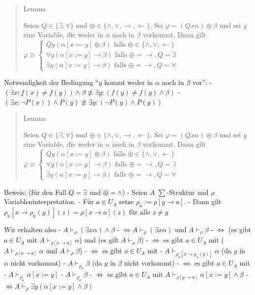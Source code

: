 \documentclass[a4paper]{article}
\begin{document}
\begin{multicols}{3}
  \begin{quote}
    Lemma

    Seien $Q\in\{\exists ,\forall\}$ und
    $\oplus\in\{\wedge,\vee,\rightarrow,\leftarrow\}$. Sei
    $\varphi= (Qx \alpha)\oplus\beta$ und sei $y$ eine Variable, die weder
    in $\alpha$ noch in $\beta$ vorkommt. Dann gilt
    $\varphi \equiv \begin{cases} Qy(\alpha[x:=y]\oplus\beta) \text{ falls } \oplus\in\{\wedge,\vee,\leftarrow\}\\ \forall y(\alpha[x:=y]\rightarrow\beta) \text{ falls } \oplus=\rightarrow,Q=\exists \\ \exists y(\alpha[x:=y]\rightarrow\beta) \text{ falls }\oplus=\rightarrow,Q=\forall\end{cases}$
  \end{quote}

  Notwendigkeit der Bedingung ``$y$ kommt weder in $\alpha$ noch in
  $\beta$ vor'': -
  $(\exists x:f(x) \not =f(y))\wedge\beta \not\equiv\exists y: (f(y) \not =f(y)\wedge\beta)$
  -
  $(\exists x:\lnot P(x))\wedge P(y)\not\equiv \exists y: (\lnot P(y) \wedge P(y))$

  \begin{quote}
    Lemma

    Seien $Q\in\{\exists,\forall\}$ und
    $\oplus\in\{\wedge,\vee,\rightarrow,\leftarrow\}$. Sei
    $\varphi= (Qx\alpha)\oplus\beta$ und sei $y$ eine Variable, die weder in
    $\alpha$ noch in $\beta$ vorkommt. Dann gilt
    $\varphi\equiv\begin{cases} Qy(\alpha[x:=y]\oplus\beta) \text{ falls }\oplus\in\{\wedge,\vee,\leftarrow\} \\ \forall y(\alpha[x:=y]\rightarrow\beta) \text{ falls }\oplus=\rightarrow,Q=\exists \\ \exists y(\alpha[x:=y]\rightarrow\beta) \text{ falls }\oplus=\rightarrow,Q=\forall \end{cases}$
  \end{quote}

  Beweis: (für den Fall $Q=\exists$ und $\oplus=\wedge$) - Seien $A$
  $\sum$-Struktur und $\rho$ Variableninterpretation. - Für $a\in U_A$
  setze $\rho_a:=\rho[y\rightarrow a]$. - Dann gilt
  $\rho_a[x\rightarrow \rho_a(y)](z) =\rho[x\rightarrow a](z)$ für alle
  $z\not=y$

  Wir erhalten also - $A\vdash_\rho (\exists x\alpha)\wedge\beta$ -
  $\Leftrightarrow A\vdash_\rho (\exists x\alpha) $ und
  $A\vdash_\rho \beta$ - $\Leftrightarrow$ (es gibt $a\in U_A$ mit
  $A\vdash_{\rho[x\rightarrow a]}\alpha$) und (es gilt
  $A\vdash_\rho \beta$) - $\Leftrightarrow$ es gibt $a\in U_A$ mit
  ($A\vdash_{\rho[x\rightarrow a]}\alpha$ und $A\vdash_\rho \beta$) -
  $\Leftrightarrow$ es gibt $a\in U_A$ mit -
  $A\vdash_{\rho_a[x\rightarrow \rho_a(y)]}\alpha$ (da $y$ in $\alpha$
  nicht vorkommt) - $A\vdash_{\rho_a} \beta$ (da $y$ in $\beta$ nicht
  vorkommt) - $\Leftrightarrow$ es gibt $a\in U_A$ mit -
  $A\vdash_{\rho_a} \alpha[x:=y]$ - $A\vdash_{\rho_a} \beta$ -
  $\Leftrightarrow$ es gibt $a\in U_A$ mit
  $A\vdash_{\rho[y\rightarrow a]}\alpha[x:=y]\wedge\beta$ -
  $\Leftrightarrow A\vdash_\rho \exists y(\alpha[x:=y]\wedge\beta)$


\end{multicols}
\end{document}
